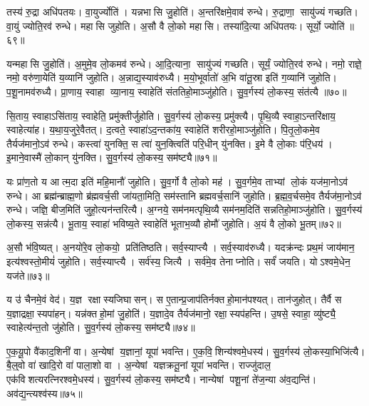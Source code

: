 तस्य॑ रु॒द्रा अधि॑पतयः। वा॒युर्ज्योति॑। यन्नभासि जु॒होति॑। अ॒न्तरि॑क्षमे॒वाव॑ रुन्धे। रु॒द्राणा॒ सायु॑ज्यं गच्छति। वा॒युं ज्योति॒रव॑ रुन्धे। महासि जुहोति। अ॒सौ वै लो॒को महासि। तस्या॑दि॒त्या अधि॑पतयः। सूर्यो॒ ज्योति॑॥६९॥

यन्महासि जु॒होति॑। अ॒मुमे॒व लो॒कमव॑ रुन्धे। आ॒दि॒त्याना॒ सायु॑ज्यं गच्छति। सूर्यं॒ ज्योति॒रव॑ रुन्धे। नमो॒ राज्ञे॒ नमो॒ वरु॑णा॒येति॑ य॒व्यानि॑ जुहोति। अ॒न्नाद्य॒स्याव॑रुध्यै। म॒यो॒भूर्वातो॑ अ॒भि वा॑तू॒स्रा इति॑ ग॒व्यानि॑ जुहोति। प॒शू॒नामव॑रुध्यै। प्रा॒णाय॒ स्वाहा व्या॒नाय॒ स्वाहेति॑ संततिहो॒माञ्जु॑होति। सु॒व॒र्गस्य॑ लो॒कस्य॒ संत॑त्यै ॥७०॥

सि॒ताय॒ स्वाहाऽसि॑ताय॒ स्वाहेति॒ प्रमु॑क्तीर्जुहोति। सु॒व॒र्गस्य॑ लो॒कस्य॒ प्रमु॑क्त्यै। पृ॒थि॒व्यै स्वाहा॒ऽन्तरि॑क्षाय॒ स्वाहेत्या॑ह। य॒था॒य॒जुरे॒वैतत्। द॒त्वते॒ स्वाहा॑ऽद॒न्तका॑य॒ स्वाहेति॑ शरीरहो॒माञ्जु॑होति। पि॒तृ॒लो॒कमे॒व तैर्यज॑मानो॒ऽव॑ रुन्धे। कस्त्वा॑ युनक्ति॒ स त्वा॑ युन॒क्त्विति॑ परि॒धीन् यु॑नक्ति। इ॒मे वै लो॒काः प॑रि॒धय॑। इ॒माने॒वास्मै॑ लो॒कान् यु॑नक्ति। सु॒व॒र्गस्य॑ लो॒कस्य॒ सम॑ष्ट्यै॥७१॥

यः प्रा॑ण॒तो य आत्म॒दा इति॑ महि॒मानौ॑ जुहोति। सु॒व॒र्गो वै लो॒को मह॑। सु॒व॒र्गमे॒व ताभ्यां लो॒कं यज॑मा॒नोऽव॑ रुन्धे। आ ब्रह्म॑न्ब्राह्म॒णो ब्र॑ह्मवर्च॒सी जा॑यता॒मिति॒ सम॑स्तानि ब्रह्मवर्च॒सानि॑ जुहोति। ब्र॒ह्म॒व॒र्चसमे॒व तैर्यज॑मा॒नोऽव॑ रुन्धे। जज्ञि॒ बीज॒मिति॑ जुहो॒त्यन॑न्तरित्यै। अ॒ग्नये॒ सम॑नमत्पृथि॒व्यै सम॑नम॒दिति॑ सन्नतिहो॒माञ्जु॑होति। सु॒व॒र्गस्य॑ लो॒कस्य॒ सन्न॑त्यै। भू॒ताय॒ स्वाहा॑ भविष्य॒ते स्वाहेति॑ भूताभ॒व्यौ होमौ॑ जुहोति। अ॒यं वै लो॒को भू॒तम्॥७२॥

अ॒सौ भ॑वि॒ष्यत्। अ॒नयो॑रे॒व लो॒कयो॒ प्रति॑तिष्ठति। सर्व॒स्याप्त्यै। सर्व॒स्याव॑रुध्यै। यदक्र॑न्दः प्रथ॒मं जाय॑मान॒ इत्य॑श्वस्तो॒मीयं॑ जुहोति। सर्व॒स्याप्त्यै। सर्व॑स्य॒ जित्यै। सर्व॑मे॒व तेनाप्नोति। सर्वं॑ जयति। योऽश्वमे॒धेन॒ यज॑ते॥७३॥

य उ॑ चैनमे॒वं वेद॑। य॒ज्ञ रक्षास्यजिघासन्। स ए॒तान्प्र॒जाप॑तिर्नक्तहो॒मान॑पश्यत्। तान॑जुहोत्। तैर्वै स य॒ज्ञाद्रक्षा॒स्यपा॑हन्। यन्न॑क्तहो॒मां जु॒होति॑। य॒ज्ञादे॒व तैर्यज॑मानो॒ रक्षा॒स्यप॑हन्ति। उ॒षसे॒ स्वाहा॒ व्यु॑ष्ट्यै॒ स्वाहेत्य॑न्त॒तो जु॑होति। सु॒व॒र्गस्य॑ लो॒कस्य॒ सम॑ष्ट्यै॥७४॥\anuvakamend[वै नभासि॒ सूर्यो॒ ज्योति॒ सन्त॑त्यै॒ सम॑ष्ट्यै भू॒तं यज॑ते॒ नव॑ च]

ए॒क॒यू॒पो वै॑काद॒शिनी॑ वा। अ॒न्येषां य॒ज्ञानां॒ यूपा॑ भवन्ति। ए॒क॒वि॒शिन्य॑श्वमे॒धस्य॑। सु॒व॒र्गस्य॑ लो॒कस्या॒भिजि॑त्यै। बै॒ल्॒वो वा॑ खादि॒रो वा॑ पाला॒शो वा। अ॒न्येषां यज्ञक्रतू॒नां यूपा॑ भवन्ति। राज्जु॑दाल॒ एक॑विशत्यरत्निरश्वमे॒धस्य॑। सु॒व॒र्गस्य॑ लो॒कस्य॒ सम॑ष्ट्यै। नान्येषां पशू॒नां ते॑ज॒न्या अ॑व॒द्यन्ति॑। अव॑द्य॒न्त्यश्व॑स्य॥७५॥

